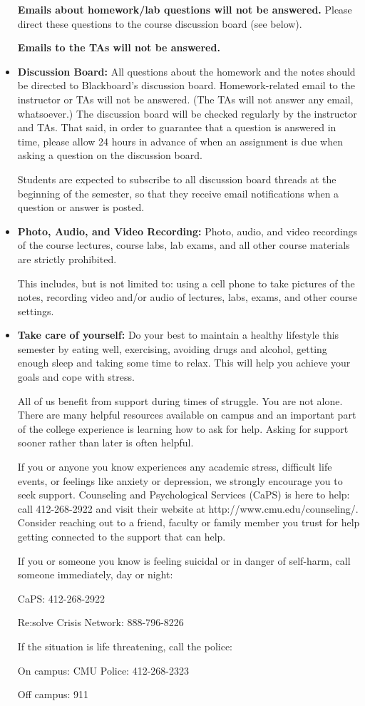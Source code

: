 \documentclass[11pt]{article}
\begin{document}
\begin{itemize}
\textbf{Emails about homework/lab questions will not be answered.}  Please direct these questions to the course discussion board (see below).
	
\textbf{Emails to the TAs will not be answered.}


\item {\bf Discussion Board:}  All questions about the homework and the notes should be directed to Blackboard's discussion board.  Homework-related email to the instructor or TAs will not be answered.  (The TAs will not answer any email, whatsoever.)  The discussion board will be checked regularly by the instructor and TAs.  That said, in order to guarantee that a question is answered in time, please allow 24 hours in advance of when an assignment is due when asking a question on the discussion board.

Students are expected to subscribe to all discussion board threads at the beginning of the semester, so that they receive email notifications when a question or answer is posted.


\item {\bf Photo, Audio, and Video Recording:}  Photo, audio, and video recordings of the course lectures, course labs, lab exams, and all other course materials are strictly prohibited.

This includes, but is not limited to:  using a cell phone to take pictures of the notes, recording video and/or audio of lectures, labs, exams, and other course settings.  

\item {\bf Take care of yourself:}  Do your best to maintain a healthy lifestyle this semester by eating well, exercising, avoiding drugs and alcohol, getting enough sleep and taking some time to relax. This will help you achieve your goals and cope with stress.

All of us benefit from support during times of struggle. You are not alone. There are many helpful resources available on campus and an important part of the college experience is learning how to ask for help. Asking for support sooner rather than later is often helpful.

If you or anyone you know experiences any academic stress, difficult life events, or feelings like anxiety or depression, we strongly encourage you to seek support. Counseling and Psychological Services (CaPS) is here to help: call 412-268-2922 and visit their website at http://www.cmu.edu/counseling/. Consider reaching out to a friend, faculty or family member you trust for help getting connected to the support that can help.

If you or someone you know is feeling suicidal or in danger of self-harm, call someone immediately, day or night:

CaPS: 412-268-2922

Re:solve Crisis Network: 888-796-8226

If the situation is life threatening, call the police:

On campus: CMU Police: 412-268-2323

Off campus: 911

\end{itemize}
\end{document}
